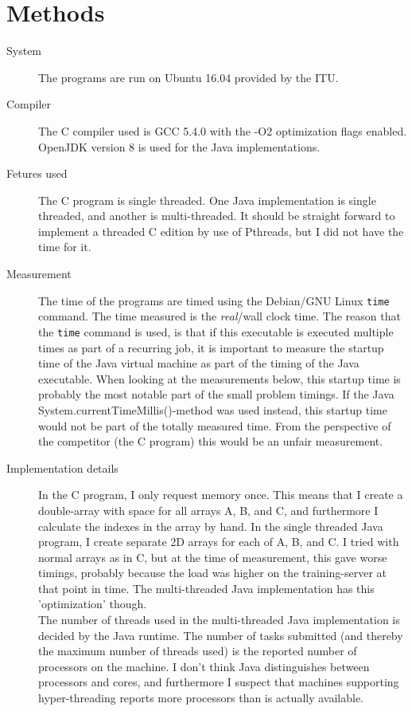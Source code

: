 \documentclass{article}
\begin{document}
	\section{Methods}
	\begin{description}
		\item[System] The programs are run on Ubuntu 16.04 provided by the ITU.
		\item[Compiler] The C compiler used is GCC 5.4.0 with the -O2 optimization flags enabled. OpenJDK version 8 is used for the Java implementations.
		\item[Fetures used] The C program is single threaded. One Java implementation is single threaded, and another is multi-threaded. It should be straight forward to implement a threaded C edition by use of Pthreads, but I did not have the time for it.
		\item[Measurement] The time of the programs are timed using the Debian/GNU Linux \texttt{time} command. The time measured is the \textit{real}/wall clock time.
		The reason that the \texttt{time} command is used, is that if this executable is executed multiple times as part of a recurring job, it is important to measure the startup time of the Java virtual machine as part of the timing of the Java executable. When looking at the measurements below, this startup time is probably the most notable part of the small problem timings.
		If the Java System.currentTimeMillis()-method was used instead, this startup time would not be part of the totally measured time. From the perspective of the competitor (the C program) this would be an unfair measurement.
		\item[Implementation details] In the C program, I only request memory once. This means that I create a double-array with space for all arrays A, B, and C, and furthermore I calculate the indexes in the array by hand. In the single threaded Java program, I create separate 2D arrays for each of A, B, and C. I tried with normal arrays as in C, but at the time of measurement, this gave worse timings, probably because the load was higher on the training-server at that point in time. The multi-threaded Java implementation has this 'optimization' though.\\
		The number of threads used in the multi-threaded Java implementation is decided by the Java runtime. The number of tasks submitted (and thereby the maximum number of threads used) is the reported number of processors on the machine. I don't think Java distinguishes between processors and cores, and furthermore I suspect that machines supporting hyper-threading reports more processors than is actually available.
	\end{description}
\end{document}
